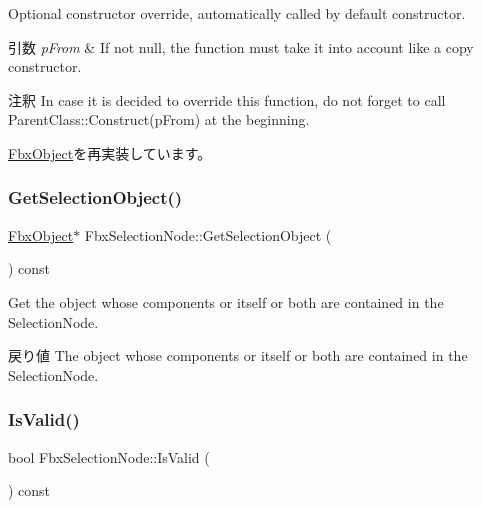 Optional constructor override, automatically called by default constructor. 
\begin{DoxyParams}{引数}
{\em p\+From} & If not null, the function must take it into account like a copy constructor. \\
\hline
\end{DoxyParams}
\begin{DoxyRemark}{注釈}
In case it is decided to override this function, do not forget to call Parent\+Class\+::\+Construct(p\+From) at the beginning. 
\end{DoxyRemark}


\hyperlink{class_fbx_object_a313503bc645af3fdceb4a99ef5cea7eb}{Fbx\+Object}を再実装しています。

\mbox{\label{class_fbx_selection_node_a1c78c8d31e14c7cb99e059963eee820c}} 
\subsubsection{\texorpdfstring{Get\+Selection\+Object()}{GetSelectionObject()}}
{\footnotesize\ttfamily \hyperlink{class_fbx_object}{Fbx\+Object}$\ast$ Fbx\+Selection\+Node\+::\+Get\+Selection\+Object (\begin{DoxyParamCaption}{ }\end{DoxyParamCaption}) const}

Get the object whose components or itself or both are contained in the Selection\+Node. \begin{DoxyReturn}{戻り値}
The object whose components or itself or both are contained in the Selection\+Node. 
\end{DoxyReturn}
\mbox{\label{class_fbx_selection_node_a600d1609bd33e1453f082a971a9498f9}} 
\subsubsection{\texorpdfstring{Is\+Valid()}{IsValid()}}
{\footnotesize\ttfamily bool Fbx\+Selection\+Node\+::\+Is\+Valid (\begin{DoxyParamCaption}{ }\end{DoxyParamCaption}) const}

